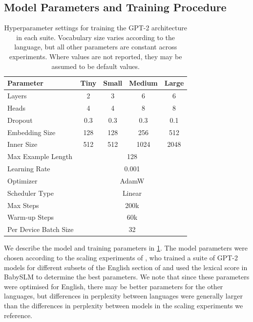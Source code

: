 \subsection{Model Parameters and Training Procedure}

\begin{table}[!ht]
    \centering
    \small
    \begin{tabular}{lcccc}
    \toprule
         Parameter & Tiny & Small & Medium & Large \\
    \midrule
         Layers & 2 & 3 & 6 & 6\\
         Heads & 4 & 4 & 8 & 8 \\
         Dropout & 0.3 & 0.3 & 0.3 & 0.1 \\
         Embedding Size & 128 & 128 & 256 & 512 \\
         Inner Size & 512 & 512 & 1024 & 2048 \\
         \midrule
         Max Example Length & \multicolumn{4}{c}{128} \\
         Learning Rate & \multicolumn{4}{c}{0.001}\\
         Optimizer & \multicolumn{4}{c}{AdamW} \\
         Scheduler Type & \multicolumn{4}{c}{Linear}\\
         Max Steps & \multicolumn{4}{c}{200k} \\
         Warm-up Steps & \multicolumn{4}{c}{60k} \\
         Per Device Batch Size & \multicolumn{4}{c}{32} \\
    \bottomrule
    \end{tabular}
    \caption{Hyperparameter settings for training the GPT-2 architecture in each suite. Vocabulary size varies according to the language, but all other parameters are constant across experiments. Where values are not reported, they may be assumed to be default values.}
    \label{tab:15-baseline_hyperparams}
\end{table}

We describe the model and training parameters in \cref{tab:15-baseline_hyperparams}. The model parameters were chosen according to the scaling experiments of \citet{goriely2025}, who trained a suite of GPT-2 models for different subsets of the English section of \ipachildes and used the lexical score in BabySLM \citep{lavechin} to determine the best parameters. We note that since these parameters were optimised for English, there may be better parameters for the other languages, but differences in perplexity between languages were generally larger than the differences in perplexity between models in the scaling experiments we reference.

